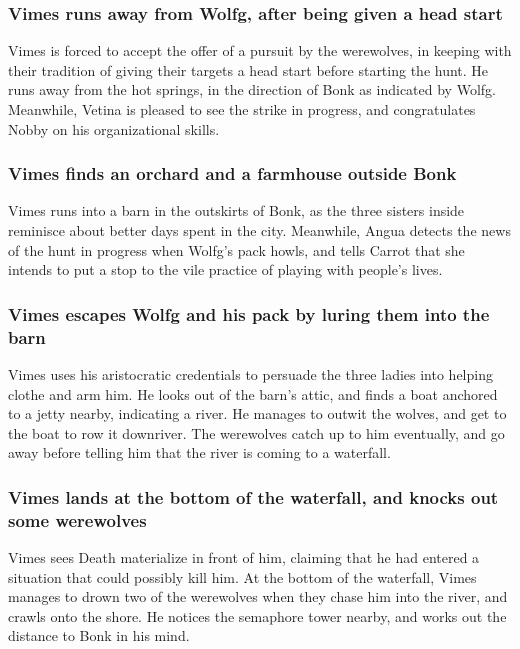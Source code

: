 \subsubsection{\Gls{Vimes} runs away from \Gls{Wolfg}, after being given a head start}
\Gls{Vimes} is forced to accept the offer of a pursuit by the werewolves, in keeping with their
tradition of giving their targets a head start before starting the hunt. He runs away from the
hot springs, in the direction of Bonk as indicated by \Gls{Wolfg}. Meanwhile, \Gls{Vetina} is pleased
to see the strike in progress, and congratulates \Gls{Nobby} on his organizational skills.

\subsubsection{\Gls{Vimes} finds an orchard and a farmhouse outside Bonk}
\Gls{Vimes} runs into a barn in the outskirts of Bonk, as the three sisters inside reminisce about
better days spent in the city. Meanwhile, \Gls{Angua} detects the news of the hunt in progress when
\Gls{Wolfg}'s pack howls, and tells \Gls{Carrot} that she intends to put a stop to the vile
practice of playing with people's lives.

\subsubsection{\Gls{Vimes} escapes \Gls{Wolfg} and his pack by luring them into the barn}
\Gls{Vimes} uses his aristocratic credentials to persuade the three ladies into helping clothe and
arm him. He looks out of the barn's attic, and finds a boat anchored to a jetty nearby, indicating
a river. He manages to outwit the wolves, and get to the boat to row it downriver. The werewolves
catch up to him eventually, and go away before telling him that the river is coming to a waterfall.

\subsubsection{\Gls{Vimes} lands at the bottom of the waterfall, and knocks out some werewolves}
\Gls{Vimes} sees \Gls{Death} materialize in front of him, claiming that he had entered a situation
that could possibly kill him. At the bottom of the waterfall, \Gls{Vimes} manages to drown two of
the werewolves when they chase him into the river, and crawls onto the shore. He notices the
semaphore tower nearby, and works out the distance to Bonk in his mind.

